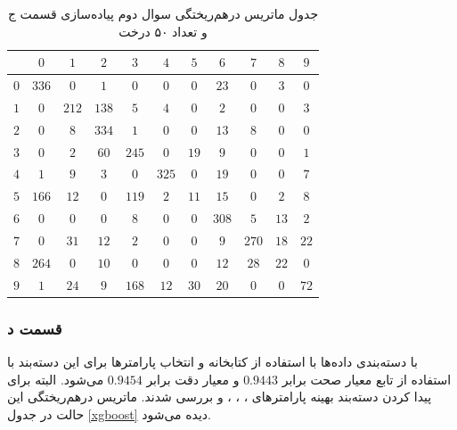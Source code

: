 \documentclass{article}
\begin{document}
\begin{table}[h]
    \centering
    \caption{جدول ماتریس درهم‌ریختگی سوال دوم پیاده‌سازی قسمت ج و تعداد ۵۰ درخت}
    \label{implementation-q2-partc-50-estimator}
    \begin{tabular}{c||c|c|c|c|c|c|c|c|c|c}
        & $0$ & $1$ & $2$ & $3$ & $4$ & $5$ & $6$ & $7$ & $8$ & $9$ \\
        \hline\hline
        $0$ & $336$ & $0$ & $1$ & $0$ & $0$ & $0$ & $23$ & $0$ & $3$ & $0$ \\
        \hline
        $1$ & $0$ & $212$ & $138$ & $5$ & $4$ & $0$ & $2$ & $0$ & $0$ & $3$ \\
        \hline
        $2$ & $0$ & $8$ & $334$ & $1$ & $0$ & $0$ & $13$ & $8$ & $0$ & $0$ \\
        \hline
        $3$ & $0$ & $2$ & $60$ & $245$ & $0$ & $19$ & $9$ & $0$ & $0$ & $1$ \\
        \hline
        $4$ & $1$ & $9$ & $3$ & $0$ & $325$ & $0$ & $19$ & $0$ & $0$ & $7$ \\
        \hline
        $5$ & $166$ & $12$ & $0$ & $119$ & $2$ & $11$ & $15$ & $0$ & $2$ & $8$ \\
        \hline
        $6$ & $0$ & $0$ & $0$ & $8$ & $0$ & $0$ & $308$ & $5$ & $13$ & $2$ \\
        \hline
        $7$ & $0$ & $31$ & $12$ & $2$ & $0$ & $0$ & $9$ & $270$ & $18$ & $22$ \\
        \hline
        $8$ & $264$ & $0$ & $10$ & $0$ & $0$ & $0$ & $12$ & $28$ & $22$ & $0$ \\
        \hline
        $9$ & $1$ & $24$ & $9$ & $168$ & $12$ & $30$ & $20$ & $0$ & $0$ & $72$
    \end{tabular}
\end{table}

\subsubsection*{قسمت د}

با دسته‌بندی داده‌ها با استفاده از کتابخانه  و انتخاب پارامتر‌ها برای این دسته‌بند
با استفاده از تابع  معیار صحت برابر $0.9443$ و
معیار دقت برابر $0.9454$ می‌شود. البته برای پیدا کردن دسته‌بند بهینه پارامتر‌های
، ، ،
 و 
بررسی شدند. ماتریس درهم‌ریختگی این حالت در جدول \ref{xgboost}
دیده می‌شود.
\end{document}

